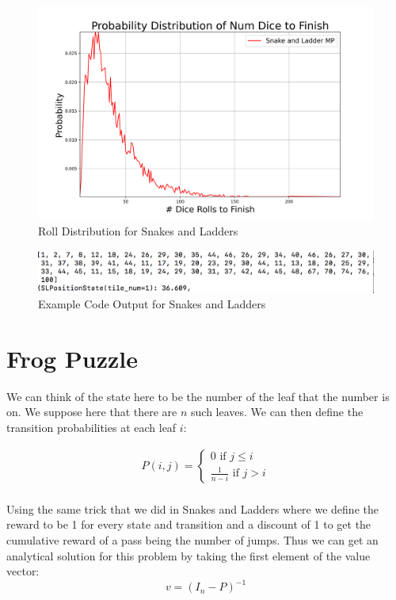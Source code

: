 \documentclass{article}[12pt]
\begin{document}
\begin{itemize}
\begin{figure}
  \includegraphics[width=\linewidth]{probs_num_rolls_finish.png}
  \caption{Roll Distribution for Snakes and Ladders}
  \label{fig:rollDist}
\end{figure}

\begin{figure}
  \includegraphics[width=\linewidth]{curl.png}
  \caption{Example Code Output for Snakes and Ladders}
  \label{fig:term_out}
\end{figure}
\end{itemize}
\section{Frog Puzzle}

We can think of the state here to be the number of the leaf that the number is on. We suppose here that there are $n$ such leaves. We can then define the transition probabilities at each leaf $i$:

\begin{align*}
P(i,j) =  \begin{cases} 0 \text{ if $j\leq i$}\\ \frac{1}{n-i} \text{ if $j>i$} \end{cases}\\
\end{align*} 

Using the same trick that we did in Snakes and Ladders where we define the reward to be 1 for every state and transition and a discount of 1 to get the cumulative reward of a pass being the number of jumps. Thus we can get an analytical solution for this problem by taking the first element of the value vector:
$$ v = (I_n - P)^{-1}$$
\end{document}
